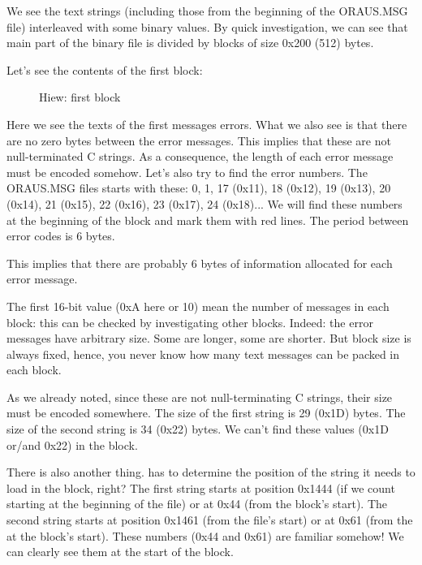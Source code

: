 We see the text strings (including those from the beginning of the ORAUS.MSG file) 
interleaved with some binary values.
By quick investigation, we can see that main part of the binary file is divided by blocks of 
size 0x200 (512) bytes.

\clearpage
Let's see the contents of the first block:

\begin{figure}[H]
\centering
{}
\caption{Hiew: first block}
\label{fig:oracle_MSB_2}
\end{figure}

Here we see the texts of the first messages errors.
What we also see is 
that there are no zero bytes between the error messages.
This implies that these are not null-terminated C strings.
As a consequence, 
the length of each error message must be encoded somehow.
Let's also try to find the error numbers.
The ORAUS.MSG files starts with these: 
0, 1, 17 (0x11), 18 (0x12), 19 (0x13), 20 (0x14), 21 (0x15), 22 (0x16), 23 (0x17), 24 (0x18)...
We will find these numbers at the beginning 
of the block and mark them with red lines.
The period between error codes is 6 bytes.

This implies that there are probably 6 bytes of information allocated for each error message.

The first 16-bit value (0xA here or 10) mean the number of messages in each block: this can be checked by investigating other blocks.
Indeed: the error messages have arbitrary size. 
Some are longer, some are shorter. 
But block size is always fixed, hence,
you never know how many text messages can be packed in each block.

As we already noted, since these are not null-terminating C strings, their size must be encoded somewhere.
The size of the first string  is 
29 (0x1D) bytes.
The size of the second string  
is 34 (0x22) bytes.
We can't find these values (0x1D or/and 0x22) in the block.%

There is also another thing.
\oracle 
has to determine the position of the string it needs to load in the block, right?
The first string  starts 
at  position 0x1444 (if we count starting at the beginning of the file) or at 0x44 (from the block's start).
The second string  
starts at position 0x1461 (from the
file's start) or at 0x61 (from the at the block's start).
These numbers (0x44 and 0x61) are familiar somehow! 
We can clearly see them at the start of the block.

